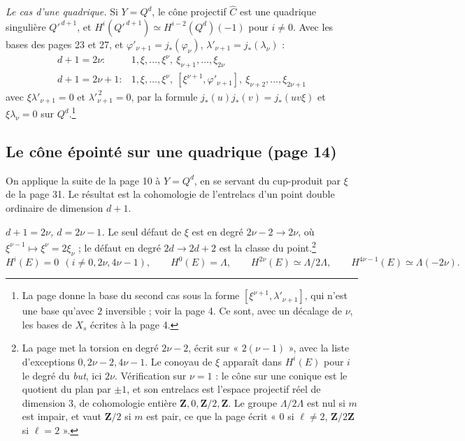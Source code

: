 \documentclass[11pt,a4paper]{article}
\begin{document}
\emph{Le cas d'une quadrique.} Si $Y = Q^{d}$, le cône projectif
$\widehat{C}$ est une quadrique singulière $Q'^{\,d+1}$, et
$H^{i}(Q'^{\,d+1}) \simeq H^{i-2}(Q^{d})(-1)$ pour $i \neq 0$. Avec les
bases des pages 23 et 27, et $\varphi'_{\nu+1} = j_{*}(\varphi_{\nu})$,
$\lambda'_{\nu+1} = j_{*}(\lambda_{\nu})$ :
\[
  \begin{array}{ll}
    d + 1 = 2\nu : & 1, \xi, \ldots, \xi^{\nu}, \ \xi_{\nu+1}, \ldots, \xi_{2\nu} \\[6pt]
    d + 1 = 2\nu + 1 : & 1, \xi, \ldots, \xi^{\nu}, \ [\xi^{\nu+1}, \varphi'_{\nu+1}], \
      \xi_{\nu+2}, \ldots, \xi_{2\nu+1}
  \end{array}
\]
avec $\xi\lambda'_{\nu+1} = 0$ et $\lambda'^{\,2}_{\nu+1} = 0$, par la
formule $j_{*}(u)j_{*}(v) = j_{*}(uv\xi)$ et $\xi\lambda_{\nu} = 0$ sur
$Q^{d}$.\footnote{La page donne la base du second cas sous la forme
$[\xi^{\nu+1}, \lambda'_{\nu+1}]$, qui n'est une base qu'avec $2$
inversible ; voir la page 4. Ce sont, avec un décalage de $\nu$, les bases
de $X_{s}$ écrites à la page 4.}

\subsection*{Le cône épointé sur une quadrique (page 14)}

On applique la suite de la page 10 à $Y = Q^{d}$, en se servant du
cup-produit par $\xi$ de la page 31. Le résultat est la cohomologie de
l'entrelacs d'un point double ordinaire de dimension $d + 1$.

\emph{$d + 1 = 2\nu$, $d = 2\nu - 1$.} Le seul défaut de $\xi$ est en
degré $2\nu - 2 \to 2\nu$, où $\xi^{\nu-1} \mapsto \xi^{\nu} = 2\xi_{\nu}$ ;
le défaut en degré $2d \to 2d + 2$ est la classe du point.\footnote{La page met la torsion en degré $2\nu - 2$, écrit sur
« $2(\nu - 1)$ », avec la liste d'exceptions $0, 2\nu - 2, 4\nu - 1$.
Le conoyau de $\xi$ apparaît dans $H^{i}(E)$ pour $i$ le degré du
\emph{but}, ici $2\nu$. Vérification sur $\nu = 1$ : le cône sur une conique
est le quotient du plan par $\pm 1$, et son entrelacs est l'espace
projectif réel de dimension $3$, de cohomologie entière
$\mathbf{Z}, 0, \mathbf{Z}/2, \mathbf{Z}$. Le groupe $\Lambda/2\Lambda$ est
nul si $m$ est impair, et vaut $\mathbf{Z}/2$ si $m$ est pair, ce que la
page écrit « $0$ si $\ell \neq 2$, $\mathbf{Z}/2\mathbf{Z}$ si
$\ell = 2$ ».}
\[
  H^{i}(E) = 0 \ \ (i \neq 0, 2\nu, 4\nu - 1), \qquad
  H^{0}(E) = \Lambda, \qquad H^{2\nu}(E) \simeq \Lambda/2\Lambda, \qquad
  H^{4\nu-1}(E) \simeq \Lambda(-2\nu) .
\]
\end{document}
